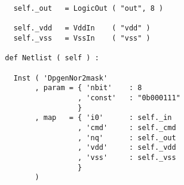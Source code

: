\begin{itemize}
\begin{verbatim}
    self._out   = LogicOut ( "out", 8 )

    self._vdd   = VddIn    ( "vdd" )
    self._vss   = VssIn    ( "vss" )
    
  def Netlist ( self ) :
      
    Inst ( 'DpgenNor2mask'
         , param = { 'nbit'    : 8
                   , 'const'   : "0b000111"
                   }
         , map   = { 'i0'      : self._in
                   , 'cmd'     : self._cmd
                   , 'nq'      : self._out
                   , 'vdd'     : self._vdd
                   , 'vss'     : self._vss
                   }
         )
\end{verbatim}
\end{itemize}
